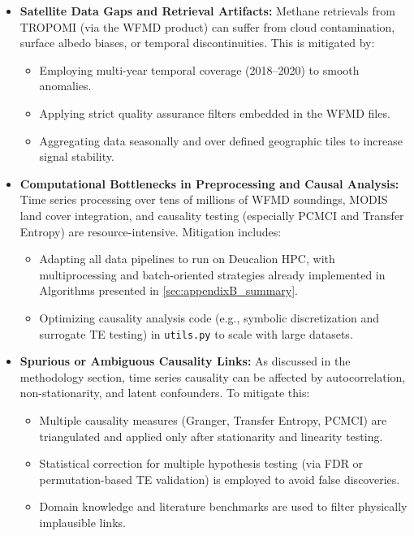 \begin{itemize}
    \item \textbf{Satellite Data Gaps and Retrieval Artifacts:} Methane retrievals from TROPOMI (via the WFMD product) can suffer from cloud contamination, surface albedo biases, or temporal discontinuities. This is mitigated by:
    \begin{itemize}
        \item Employing multi-year temporal coverage (2018–2020) to smooth anomalies.
        \item Applying strict quality assurance filters embedded in the WFMD files.
        \item Aggregating data seasonally and over defined geographic tiles to increase signal stability.
    \end{itemize}

    \item \textbf{Computational Bottlenecks in Preprocessing and Causal Analysis:} Time series processing over tens of millions of WFMD soundings, MODIS land cover integration, and causality testing (especially PCMCI and Transfer Entropy) are resource-intensive. Mitigation includes:
    \begin{itemize}
        \item Adapting all data pipelines to run on Deucalion HPC, with multiprocessing and batch-oriented strategies already implemented in Algorithms presented in \ref{sec:appendixB_summary}.
        \item Optimizing causality analysis code (e.g., symbolic discretization and surrogate TE testing) in \texttt{utils.py} to scale with large datasets.
    \end{itemize}

    \item \textbf{Spurious or Ambiguous Causality Links:} As discussed in the methodology section, time series causality can be affected by autocorrelation, non-stationarity, and latent confounders. To mitigate this:
    \begin{itemize}
        \item Multiple causality measures (Granger, Transfer Entropy, PCMCI) are triangulated and applied only after stationarity and linearity testing.
        \item Statistical correction for multiple hypothesis testing (via FDR or permutation-based TE validation) is employed to avoid false discoveries.
        \item Domain knowledge and literature benchmarks are used to filter physically implausible links.
    \end{itemize}


\end{itemize}
